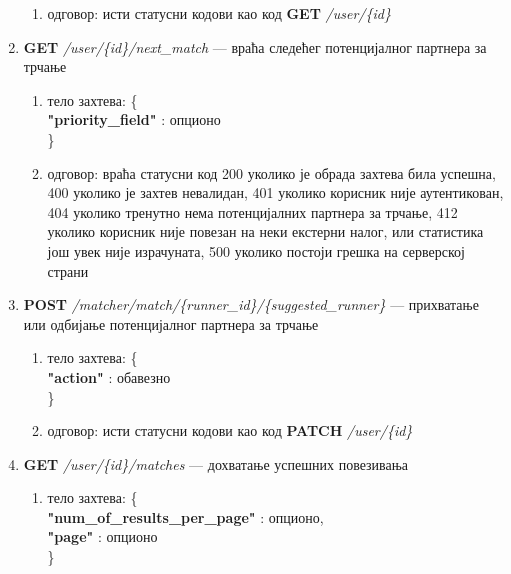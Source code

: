 \documentclass[12pt,oneside]{memoir}
\begin{document}
\begin{enumerate}
        \begin{enumerate}
            \item одговор: исти статусни кодови као код \textbf{GET} \textit{/user/\{id\}}
        \end{enumerate}
    \item \textbf{GET} \textit{/user/\{id\}/next\_match} --- враћа следећег потенцијалног партнера за трчање
        \begin{enumerate}
            \item тело захтева: \{\\
                    \hspace*{1cm} \textbf{"priority\_field"} : опционо\\
                \}
            \item одговор: враћа статусни код 200 уколико је обрада захтева била успешна, 400 уколико је захтев невалидан, 401 уколико корисник није аутентикован, 404 уколико тренутно нема потенцијалних партнера за трчање, 412 уколико корисник није повезан на неки екстерни налог, или статистика још увек није израчуната, 500 уколико постоји грешка на серверској страни
        \end{enumerate}
    \item \textbf{POST} \textit{/matcher/match/\{runner\_id\}/\{suggested\_runner\}} --- прихватање или одбијање потенцијалног партнера за трчање
        \begin{enumerate}
            \item тело захтева: \{\\
                    \hspace*{1cm} \textbf{"action"} : обавезно\\
                \}
            \item одговор: исти статусни кодови као код \textbf{PATCH} \textit{/user/\{id\}}
        \end{enumerate}
    \item \textbf{GET} \textit{/user/\{id\}/matches} --- дохватање успешних повезивања
        \begin{enumerate}
            \item тело захтева: \{\\
                    \hspace*{1cm} \textbf{"num\_of\_results\_per\_page"} : опционо,\\
                    \hspace*{1cm} \textbf{"page"} : опционо\\
                \}

\end{enumerate}
\end{enumerate}
\end{document}
